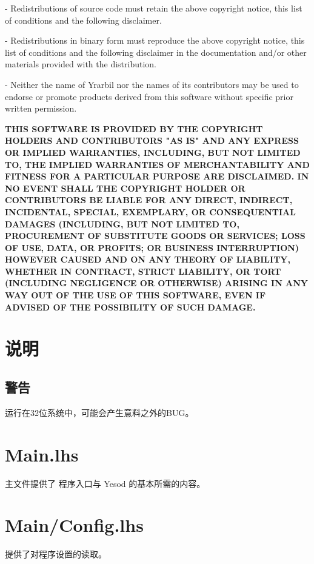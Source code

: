   - Redistributions of source code must retain the above copyright notice, this
  list of conditions and the following disclaimer.
  \par \vspace{0.25em}
  - Redistributions in binary form must reproduce the above copyright notice,
  this list of conditions and the following disclaimer in the documentation
  and/or other materials provided with the distribution.
  \par \vspace{0.25em}
  - Neither the name of Yrarbil nor the names of its
  contributors may be used to endorse or promote products derived from
  this software without specific prior written permission.
  
  \vfill
  \textbf{THIS SOFTWARE IS PROVIDED BY THE COPYRIGHT HOLDERS AND CONTRIBUTORS "AS IS"
      AND ANY EXPRESS OR IMPLIED WARRANTIES, INCLUDING, BUT NOT LIMITED TO, THE
      IMPLIED WARRANTIES OF MERCHANTABILITY AND FITNESS FOR A PARTICULAR PURPOSE ARE
      DISCLAIMED. IN NO EVENT SHALL THE COPYRIGHT HOLDER OR CONTRIBUTORS BE LIABLE
      FOR ANY DIRECT, INDIRECT, INCIDENTAL, SPECIAL, EXEMPLARY, OR CONSEQUENTIAL
      DAMAGES (INCLUDING, BUT NOT LIMITED TO, PROCUREMENT OF SUBSTITUTE GOODS OR
      SERVICES; LOSS OF USE, DATA, OR PROFITS; OR BUSINESS INTERRUPTION) HOWEVER
      CAUSED AND ON ANY THEORY OF LIABILITY, WHETHER IN CONTRACT, STRICT LIABILITY,
      OR TORT (INCLUDING NEGLIGENCE OR OTHERWISE) ARISING IN ANY WAY OUT OF THE USE
      OF THIS SOFTWARE, EVEN IF ADVISED OF THE POSSIBILITY OF SUCH DAMAGE.}
  \newpage
  \tableofcontents
  \newpage

  \section{说明}
  \subsection{警告}
  运行在32位系统中，可能会产生意料之外的BUG。

  \section[程序主文件 Main.lhs文件]{Main.lhs}
  主文件提供了 程序入口与 Yesod 的基本所需的内容。
  

  \section[设置载入文件 Main/Config.lhs文件]{Main/Config.lhs}
  提供了对程序设置的读取。
  

